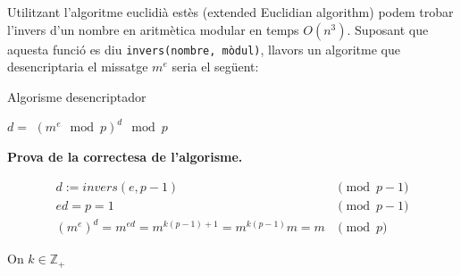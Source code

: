 \documentclass[a4paper]{article}
\begin{document}
\begin{enumerate}
Utilitzant l'algoritme euclidià estès (extended Euclidian algorithm) podem trobar l'invers d'un nombre en aritmètica modular en temps $O(n^3)$. Suposant que aquesta funció es diu \texttt{invers(nombre, mòdul)}, llavors un algoritme que desencriptaria el missatge $m^e$ seria el següent:

\begin{algorithm}[H]
	\caption{Algorisme desencriptador}
	\begin{algorithmic}
			\State $d =$ 
			\State \Return $(m^e \mod p)^d \mod p$
		\EndFunction
	\end{algorithmic}
\end{algorithm}

\textbf{Prova de la correctesa de l'algorisme.}

\begin{align*}
	d := invers(e, p-1) &\pmod{p-1} \\
	e d = p = 1 &\pmod{p-1} \\
	(m^e)^d = m^{e d} = m^{k(p-1)+1} = m^{k(p-1)} m = m &\pmod{p}
\end{align*}

On $k \in \mathbb{Z}_+$

\end{enumerate}
\end{document}
